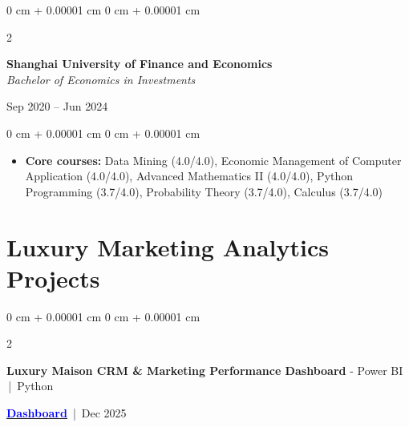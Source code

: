 \documentclass[10pt, a4paper]{article}
\newenvironment{highlights}{
    \begin{itemize}[
        topsep=0.04 cm,
        parsep=0.02cm,
        partopsep=0pt,
        itemsep=0pt,
        leftmargin=0 cm + 10pt
    ]
}{
    \end{itemize}
} %
\newcommand{\stronglink}[2]{%
    \href{#1}{\textbf{\uline{\textcolor{blue}{#2}}}}%
}
\newenvironment{onecolentry}{
    \begin{adjustwidth}{
        0 cm + 0.00001 cm
    }{
        0 cm + 0.00001 cm
    }
}{
    \end{adjustwidth}
} %
\newenvironment{twocolentry}[2][]{
    \onecolentry
    \def\secondColumn{#2}
    \setcolumnwidth{\fill, 4.6 cm}
    \begin{paracol}{2}
}{
    \switchcolumn \raggedleft \secondColumn
    \end{paracol}
    \endonecolentry
} %
\begin{document}
        \vspace{0.12 cm}

        \begin{twocolentry}{Sep 2020 – Jun 2024}
            \textbf{Shanghai University of Finance and Economics} \\
            \textit{Bachelor of Economics in Investments}
        \end{twocolentry}

        \vspace{0.10 cm}
        \begin{onecolentry}
            \begin{highlights}
                \item \textbf{Core courses:} Data Mining (4.0/4.0), Economic Management of Computer Application (4.0/4.0), Advanced Mathematics II (4.0/4.0), Python Programming (3.7/4.0), Probability Theory (3.7/4.0), Calculus (3.7/4.0)
            \end{highlights}
        \end{onecolentry}

    \section{Luxury Marketing Analytics Projects}
        \begin{twocolentry}{
            \stronglink{https://app.powerbi.com/view?r=eyJrIjoiMmQ2MjBmYzMtYWZjYy00MjdlLThjMDQtYzllNTNiMTU0OGJkIiwidCI6IjYxZjNlM2I4LTliNTItNDMzYS1hNGViLWM2NzMzNGNlNTRkNSIsImMiOjh9&pageName=f5f8b60aeb33018aea07}{Dashboard} \,|\, Dec 2025
        }
            \textbf{Luxury Maison CRM \& Marketing Performance Dashboard} - Power BI \,|\, Python
        \end{twocolentry}
\end{document}
